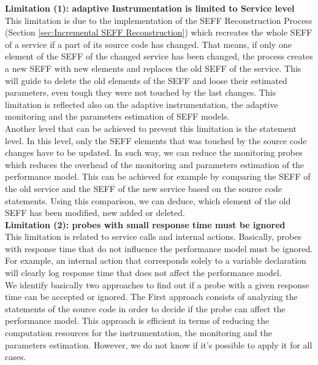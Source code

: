 \textbf{Limitation (1): adaptive Instrumentation is limited to Service level}\\
This limitation is due to the implementation of the SEFF Reconstruction Process (Section \ref{sec:Incremental SEFF Reconstruction}) which recreates the whole SEFF of a service if a part of its source code has changed. That means, if only one element of the SEFF of the changed service has been changed, the process creates a new SEFF with new elements and replaces the old SEFF of the service. This will guide to delete the old elements of the SEFF and loose their estimated parameters, even tough they were not touched by the last changes. This limitation is reflected also on the adaptive instrumentation, the adaptive monitoring and the parameters estimation of SEFF models.\\ 

Another level that can be achieved to prevent this limitation is the statement level. In this level, only the SEFF elements that was touched by the source code changes have to be updated. In such way, we can reduce the monitoring probes which reduces the overhead of the monitoring and parameters estimation of the performance model. This can be achieved for example by comparing the SEFF of the old service and the SEFF of the new service based on the source code statements. Using this comparison, we can deduce, which element of the old SEFF has been modified, new added or deleted.  \\

\textbf{Limitation (2): probes with small response time must be ignored}\\
This limitation is related to service calls and internal actions. Basically, probes with response time that do not influence the performance model must be ignored. For example, an internal action that corresponds solely to a variable declaration will clearly log response time that does not affect the performance model.\\
 
We identify basically two approaches to find out if a probe with a given response time can be accepted or ignored. The First approach consists of analyzing the statements of the source code in order to decide if the probe can affect the performance model. This approach is efficient in terms of reducing the computation resources for the instrumentation, the monitoring and the parameters estimation.  However, we do not know if it's possible to apply it for all cases.\\


